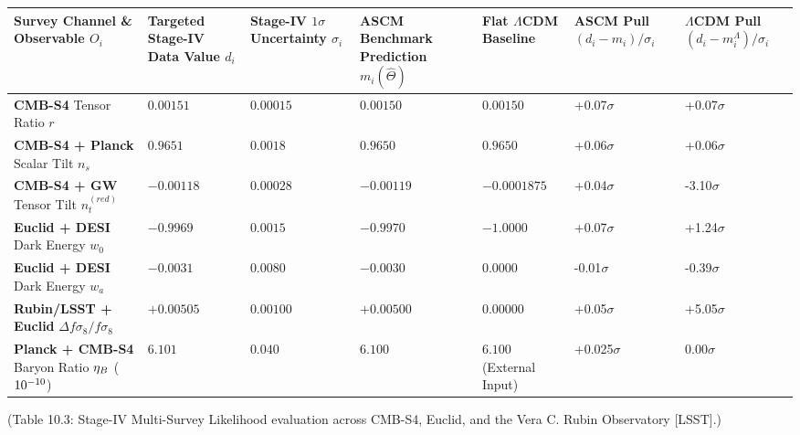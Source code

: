 \documentclass[aps,prd,onecolumn,superscriptaddress,nofootinbib,longbibliography,10pt]{revtex4-2}
\begin{document}
  
\begin{center}
\begin{tabular}{|lllllll|}
\hline

      Survey Channel \& Observable \(O_i\) & Targeted Stage-IV Data Value \(d_i\) & Stage-IV \(1\sigma\) Uncertainty \(\sigma_i\) & ASCM Benchmark Prediction \(m_i(\hat{\Theta})\) & Flat $\Lambda$CDM Baseline & ASCM Pull \((d_i - m_i)/\sigma_i\) & $\Lambda$CDM Pull \((d_i - m_i^\Lambda)/\sigma_i\)
       \\ \hline

    
    
      \textbf{CMB-S4} Tensor Ratio \(r\) & \(0.00151\) & \(0.00015\) & \(0.00150\) & \(0.00150\) & +0.07$\sigma$ & +0.07$\sigma$ \\ \hline

      \textbf{CMB-S4 + Planck} Scalar Tilt \(n_s\) & \(0.9651\) & \(0.0018\) & \(0.9650\) & \(0.9650\) & +0.06$\sigma$ & +0.06$\sigma$ \\ \hline

      \textbf{CMB-S4 + GW} Tensor Tilt \(n_t^{(red)}\) & \(-0.00118\) & \(0.00028\) & \(-0.00119\) & \(-0.0001875\) & +0.04$\sigma$ & -3.10$\sigma$ \\ \hline

      \textbf{Euclid + DESI} Dark Energy \(w_0\) & \(-0.9969\) & \(0.0015\) & \(-0.9970\) & \(-1.0000\) & +0.07$\sigma$ & +1.24$\sigma$ \\ \hline

      \textbf{Euclid + DESI} Dark Energy \(w_a\) & \(-0.0031\) & \(0.0080\) & \(-0.0030\) & \(0.0000\) & -0.01$\sigma$ & -0.39$\sigma$ \\ \hline

      \textbf{Rubin/LSST + Euclid} \(\Delta f\sigma_8/f\sigma_8\) & \(+0.00505\) & \(0.00100\) & \(+0.00500\) & \(0.00000\) & +0.05$\sigma$ & +5.05$\sigma$ \\ \hline

      \textbf{Planck + CMB-S4} Baryon Ratio \({\eta_{{\normalsize B}}}\) (\(10^{{\normalsize -10}}\)) & \(6.101\) & \(0.040\) & \(6.100\) & \(6.100\) (External Input) & +0.025$\sigma$ & 0.00$\sigma$ \\ \hline

    
  \end{tabular}
\end{center}

  (Table 10.3: Stage-IV Multi-Survey Likelihood evaluation across CMB-S4, Euclid, and the Vera C. Rubin Observatory [LSST].)
\end{document}
